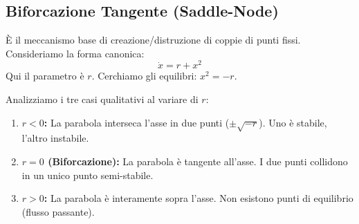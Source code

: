 \documentclass[openany]{book}
\theoremstyle{definition}
\theoremstyle{remark}
\begin{document}
\subsection{Biforcazione Tangente (Saddle-Node)}
È il meccanismo base di creazione/distruzione di coppie di punti fissi.
Consideriamo la forma canonica:
\[ \dot{x} = r + x^2 \]
Qui il parametro è $r$. Cerchiamo gli equilibri: $x^2 = -r$.

Analizziamo i tre casi qualitativi al variare di $r$:
\begin{enumerate}
    \item \textbf{$r < 0$:} La parabola interseca l'asse in due punti ($\pm\sqrt{-r}$). Uno è stabile, l'altro instabile.
    \item \textbf{$r = 0$ (Biforcazione):} La parabola è tangente all'asse. I due punti collidono in un unico punto semi-stabile.
    \item \textbf{$r > 0$:} La parabola è interamente sopra l'asse. Non esistono punti di equilibrio (flusso passante).
\end{enumerate}
\end{document}
